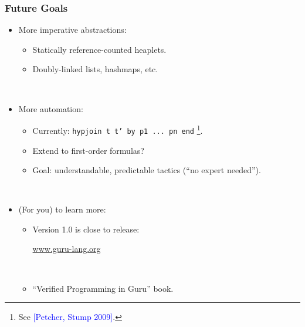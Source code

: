 \documentclass[10pt]{beamer}
\begin{document}
\begin{frame}
\frametitle{Future Goals}

\begin{itemize}
\item More imperative abstractions:
\begin{itemize}
\item Statically reference-counted heaplets.
\item Doubly-linked lists, hashmaps, etc.
\end{itemize}

\ 

\item More automation:
\begin{itemize}
\item Currently: \texttt{hypjoin t t' by p1 ... pn end} \footnote{See \textcolor{blue}{[Petcher, Stump 2009]}.}.
\item Extend to first-order formulas?
\item Goal: understandable, predictable tactics (``no expert needed'').
\end{itemize}

\ 

\item (For you) to learn more:

\begin{itemize}
\item Version 1.0 is close to release:
\begin{center}
\Large
\textcolor{blue}{\url{www.guru-lang.org}}
\end{center}

\ 
\item ``Verified Programming in Guru'' book.
\end{itemize}

\end{itemize}

\end{frame}
\end{document}
